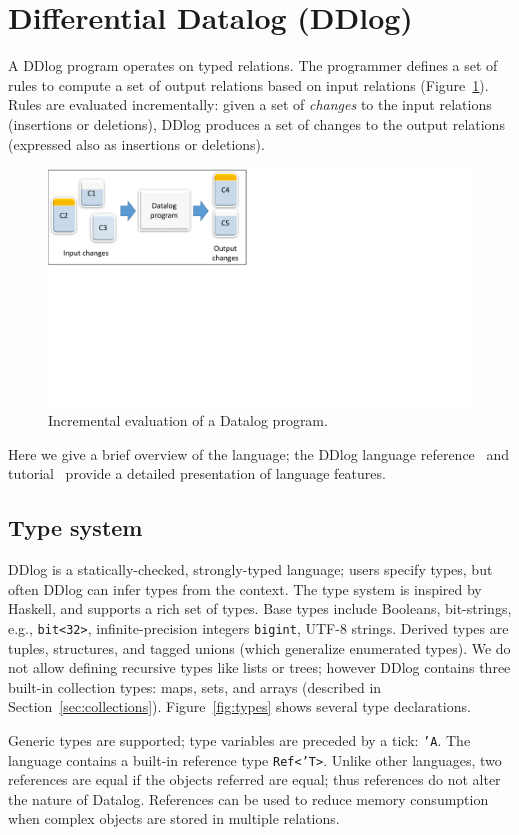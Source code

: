 \section{Differential Datalog (DDlog)}\label{sec-ddlog}

A DDlog program operates on typed relations.  The programmer defines a
set of rules to compute a set of output relations based on input
relations (Figure~\ref{fig:differential}).  Rules are evaluated
incrementally: given a set of \emph{changes} to the input relations
(insertions or deletions), DDlog produces a set of changes to the
output relations (expressed also as insertions or deletions).

\begin{figure}[t]
    \center
    \includegraphics[width=0.5\columnwidth,clip=true,trim=0in 4.4in 6.5in 0in]{differential.pdf}
    \caption{Incremental evaluation of a Datalog program.\label{fig:differential}}
\end{figure}

Here we give a brief overview of the language; the DDlog language
reference~\cite{ddlog-manual} and tutorial~\cite{ddlog-tutorial}
provide a detailed presentation of language features.

\subsection{Type system}

DDlog is a statically-checked, strongly-typed language; users specify
types, but often DDlog can infer types from the context.  The type
system is inspired by Haskell, and supports a rich set of types.  Base
types include Booleans, bit-strings, e.g., \texttt{bit<32>},
infinite-precision integers \texttt{bigint}, UTF-8 strings.  Derived
types are tuples, structures, and tagged unions (which generalize
enumerated types).  We do not allow defining recursive types like
lists or trees; however DDlog contains three built-in collection
types: maps, sets, and arrays (described in
Section~\ref{sec:collections}).  Figure~\ref{fig:types} shows several type declarations.

Generic types are supported; type variables are preceded by a tick:
\texttt{'A}.  The language contains a built-in reference type
\texttt{Ref<'T>}.  Unlike other languages, two references are equal if
the objects referred are equal; thus references do not alter the
nature of Datalog.  References can be used to reduce memory
consumption when complex objects are stored in multiple relations.

